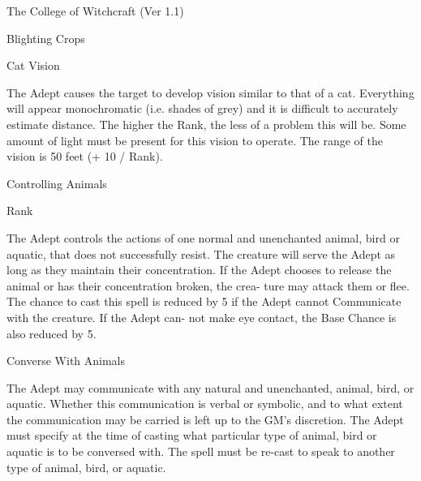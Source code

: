 \begin{Chapter}{The College of Witchcraft (Ver 1.1)}
\begin{spell}[S-4]{Blighting Crops }
\begin{effects}
\end{effects}
\end{spell}

\begin{spell}[S-5]{Cat Vision }

\begin{effects}
 The  Adept  causes  the  target  to  develop 
vision  similar  to  that  of  a  cat.  Everything  will 
appear  monochromatic  (i.e.  shades  of  grey)  and  it 
is  difficult  to  accurately  estimate  distance.  The 
higher the Rank, the less of a problem this will be. 
Some  amount  of  light  must  be  present  for  this 
vision to operate. The range of the vision is 50 feet 
(+ 10 / Rank). 

\end{effects}
\end{spell}

\begin{spell}[S-6]{Controlling Animals }

Rank 
\begin{effects}
 The  Adept  controls  the  actions  of  one 
normal  and  unenchanted  animal,  bird  or  aquatic, 
that  does  not  successfully  resist.  The  creature  will 
serve  the  Adept  as  long  as  they  maintain  their 
concentration.  If  the  Adept  chooses  to  release  the 
animal or has their concentration broken, the crea-
ture  may  attack  them  or  flee.  The  chance  to  cast 
this  spell  is  reduced  by  5  if  the  Adept  cannot 
Communicate  with  the  creature.  If  the  Adept  can-
not  make  eye  contact,  the  Base  Chance  is  also 
reduced by 5. 

\end{effects}
\end{spell}

\begin{spell}[S-7]{Converse With Animals }


\begin{effects}
 The  Adept  may  communicate  with  any 
natural  and  unenchanted,  animal,  bird,  or  aquatic. 
Whether this communication is verbal or symbolic, 
and  to  what  extent  the  communication  may  be 
carried is left up to the GM’s discretion. The Adept 
must specify at the time of casting what particular 
type  of  animal,  bird  or  aquatic  is  to  be  conversed 
with. The spell must be re-cast to speak to another 
type of animal, bird, or aquatic. 


\end{effects}
\end{spell}
\end{Chapter}
